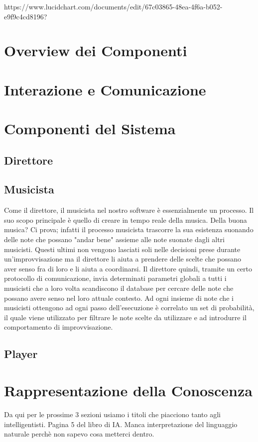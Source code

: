 \documentclass[a4paper,10pt]{article}
\begin{document}
https://www.lucidchart.com/documents/edit/67c03865-48ea-4f6a-b052-e9f9c4cd8196?

\section{Overview dei Componenti}

\section{Interazione e Comunicazione}

\section{Componenti del Sistema}
\subsection{Direttore}

\subsection{Musicista}
Come il direttore, il musicista nel nostro software è essenzialmente un processo. Il suo scopo principale è quello di creare in tempo reale della musica. Della buona musica? Ci prova; infatti il processo musicista trascorre la sua esistenza suonando delle note che possano "andar bene" assieme alle note suonate dagli altri musicisti. Questi ultimi non vengono lasciati soli nelle decisioni prese durante un'improvvisazione ma il direttore li aiuta a prendere delle scelte che possano aver senso fra di loro e li aiuta a coordinarsi. Il direttore quindi, tramite un certo protocollo di comunicazione, invia determinati parametri globali a tutti i musicisti che a loro volta scandiscono il database per cercare delle note che possano avere senso nel loro attuale contesto. Ad ogni insieme di note che i musicisti ottengono ad ogni passo dell'esecuzione è correlato un set di probabilità, il quale viene utilizzato per filtrare le note scelte da utilizzare e ad introdurre il comportamento di improvvisazione.

\subsection{Player}


\section{Rappresentazione della Conoscenza}
Da qui per le prossime 3 sezioni usiamo i titoli che piacciono tanto 
agli intelligentisti. Pagina 5 del libro di IA. 
Manca interpretazione del linguaggio naturale perchè non sapevo cosa metterci dentro.
\end{document}

